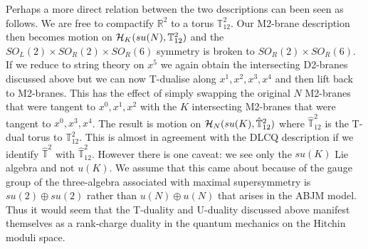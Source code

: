 \documentclass[12pt]{article}
\numberwithin{equation}{section}
\begin{document}
Perhaps a more direct relation between the two descriptions can been seen as follows. We are free to compactify ${\mathbb R}^2$ to a torus ${\mathbb T}^2_{12}$.  Our M2-brane description then becomes motion on ${\cal H}_K(su(N),{\mathbb T}^2_{12})$ and the   $SO_L(2)\times SO_R(2)\times SO_R(6)$ symmetry is broken to  $SO_R(2)\times SO_R(6)$.  If we reduce to string theory on $x^5$ we again  obtain the intersecting D2-branes discussed above but we can now T-dualise along $x^1,x^2,x^3,x^4$ and then lift back to M2-branes. This has the effect of simply swapping the original $N$ M2-branes that were tangent to $x^0,x^1,x^2$ with the $K$ intersecting M2-branes that were tangent to $x^0,x^3,x^4$. The result is  motion on ${\cal H}_N(su(K),\hat {\mathbb T}^2_{12})$ where  $\hat {\mathbb T}^2_{12}$ is the T-dual torus to ${\mathbb T}^2_{12}$. This is almost in agreement with the DLCQ description if we identify $\hat {\mathbb T}^2$ with $\hat {\mathbb T}^2_{12}$. However there is one caveat: we see only the $su(K)$ Lie algebra and not $u(K)$. We assume that this came about because of the gauge group of the three-algebra associated with maximal supersymmetry is $su(2)\oplus su(2)$ rather than $u(N)\oplus u(N)$ that arises in the ABJM model. Thus it would seem that the T-duality and U-duality discussed  above manifest themselves as a rank-charge duality in the quantum mechanics on the Hitchin moduli space. 
\end{document}
